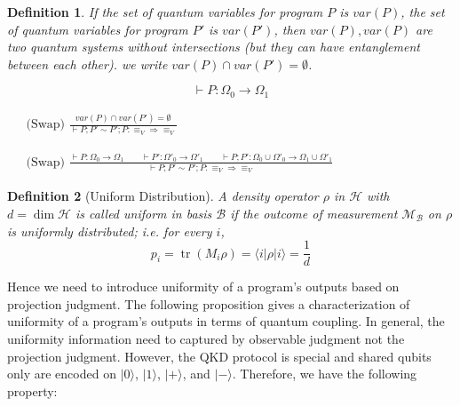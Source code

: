 \documentclass{report}
\newtheorem{definition}{Definition}[section]
\theoremstyle{defn_style}
\begin{document}
\begin{definition}
If the set of  quantum variables for program $P$ is $var( P)$, the set of  quantum variables for program $P'$ is $var( P')$, then $var( P), var( P)$ are two quantum systems without intersections (but they can have entanglement between each other). 
we write $var( P) \cap var( P' )=\emptyset$.
\end{definition}

\[\vdash P: \Omega_0 \rightarrow \Omega_1\]

$\begin{aligned} & \text { (Swap) }
\frac{ var( P) \cap var( P' )=\emptyset}{\vdash P ; P' \sim P' ; P: \equiv_V \Longrightarrow \equiv_V}
\end{aligned}$

$\begin{aligned} & \text { (Swap) }
\frac{ \vdash P:\Omega_0\rightarrow\Omega_1\qquad \vdash P':\Omega'_0\rightarrow\Omega'_1\qquad  \vdash P;P':\Omega_0\cup \Omega'_0 \rightarrow\Omega_1\cup \Omega'_1}{\vdash P ; P' \sim P' ; P: \equiv_V \Longrightarrow \equiv_V}
\end{aligned}$

\begin{definition}[Uniform Distribution]
    A density operator $\rho$ in $\mathcal{H}$ with $d=\operatorname{dim} \mathcal{H}$ is called uniform in basis $\mathcal{B}$ if the outcome of measurement $\mathcal{M}_{\mathcal{B}}$ on $\rho$ is uniformly distributed; i.e. for every $i$,
$$
p_i=\operatorname{tr}\left(M_i \rho\right)=\langle i| \rho|i\rangle=\frac{1}{d}
$$

\end{definition}

Hence we need to introduce uniformity of a program's outputs based on projection judgment.
The following proposition gives a characterization of uniformity of a program's outputs in terms of quantum coupling. In general, the uniformity information need to captured by observable judgment not the projection judgment. However, the QKD protocol is special and shared qubits only are encoded on $|0\rangle$, $|1\rangle$, $|+\rangle$, and $|-\rangle$. Therefore, we have the following property:
\end{document}
